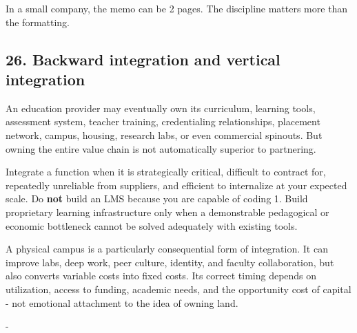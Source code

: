 In a small company, the memo can be 2 pages. The discipline matters more than the formatting.

\subsection{26. Backward integration and vertical integration}

An education provider may eventually own its curriculum, learning tools, assessment system, teacher training, credentialing relationships, placement network, campus, housing, research labs, or even commercial spinouts. But owning the entire value chain is not automatically superior to partnering.

Integrate a function when it is strategically critical, difficult to contract for, repeatedly unreliable from suppliers, and efficient to internalize at your expected scale. Do \textbf{not} build an LMS because you are capable of coding 1. Build proprietary learning infrastructure only when a demonstrable pedagogical or economic bottleneck cannot be solved adequately with existing tools.

A physical campus is a particularly consequential form of integration. It can improve labs, deep work, peer culture, identity, and faculty collaboration, but also converts variable costs into fixed costs. Its correct timing depends on utilization, access to funding, academic needs, and the opportunity cost of capital - not emotional attachment to the idea of owning land.

-


